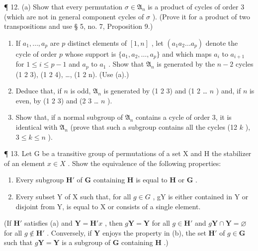 ¶ 12. (a) Show that every permutation \(\sigma \in \mathfrak{A}_n\) is a product of cycles of order 3 (which are not in general component cycles of \(\sigma\) ). (Prove it for a product of two transpositions and use § 5, no. 7, Proposition 9.)

\begin{enumerate}
\def\labelenumi{(\alph{enumi})}
\setcounter{enumi}{1}
\item
  If \(a_1, \ldots, a_p\) are \(p\) distinct elements of \([1, n]\) , let \((a_1 a_2 \ldots a_p)\) denote the cycle of order \(p\) whose support is \(\{a_1, a_2, \ldots, a_p\}\) and which maps \(a_i\) to \(a_{i+1}\) for \(1 \leqslant i \leqslant p-1\) and \(a_p\) to \(a_1\) . Show that \(\mathfrak{A}_n\) is generated by the \(n-2\) cycles (1 2 3), (1 2 4), \ldots, (1 2 n). (Use (a).)
\item
  Deduce that, if \(n\) is odd, \(\mathfrak{A}_n\) is generated by (1 2 3) and (1 2 \ldots{} \(n\) ) and, if \(n\) is even, by (1 2 3) and (2 3 \ldots{} \(n\) ).
\item
  Show that, if a normal subgroup of \(\mathfrak{A}_n\) contains a cycle of order 3, it is identical with \(\mathfrak{A}_n\) (prove that such a subgroup contains all the cycles (12 \(k\) ), \(3 \leqslant k \leqslant n\) ).
\end{enumerate}

¶ 13. Let G be a transitive group of permutations of a set X and H the stabilizer of an element \(x \in X\) . Show the equivalence of the following properties:

\begin{enumerate}
\def\labelenumi{(\alph{enumi})}
\item
  Every subgroup \(\mathbf{H}'\) of \(\mathbf{G}\) containing \(\mathbf{H}\) is equal to \(\mathbf{H}\) or \(\mathbf{G}\) .
\item
  Every subset Y of X such that, for all \(g \in G\) , gY is either contained in Y or disjoint from Y, is equal to X or consists of a single element.
\end{enumerate}

(If \(\mathbf{H}'\) satisfies (a) and \(\mathbf{Y} = \mathbf{H}'x\) , then \(g\mathbf{Y} = \mathbf{Y}\) for all \(g \in \mathbf{H}'\) and \(g\mathbf{Y} \cap \mathbf{Y} = \varnothing\) for all \(g \notin \mathbf{H}'\) . Conversely, if \(\mathbf{Y}\) enjoys the property in (b), the set \(\mathbf{H}'\) of \(g \in \mathbf{G}\) such that \(g\mathbf{Y} = \mathbf{Y}\) is a subgroup of \(\mathbf{G}\) containing \(\mathbf{H}\) .)

